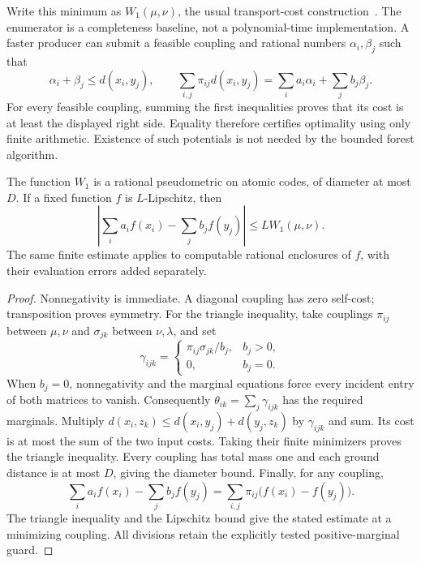 Write this minimum as \(W_1(\mu,\nu)\), the usual transport-cost construction~\cite{peyre2019}.  The enumerator is a completeness
baseline, not a polynomial-time implementation.  A faster producer can
submit a feasible coupling and rational numbers \(\alpha_i,\beta_j\)
such that
\[
 \alpha_i+\beta_j\leq d(x_i,y_j),\qquad
 \sum_{i,j}\pi_{ij}d(x_i,y_j)=\sum_i a_i\alpha_i+\sum_j b_j\beta_j.
\]
For every feasible coupling, summing the first inequalities proves that
its cost is at least the displayed right side.  Equality therefore
certifies optimality using only finite arithmetic.  Existence of such
potentials is not needed by the bounded forest algorithm.

\begin{lemma}
\label{lem:transport-metric}
The function \(W_1\) is a rational pseudometric on atomic codes, of
diameter at most \(D\).  If a fixed function \(f\) is \(L\)-Lipschitz,
then
\[
 \left|\sum_i a_if(x_i)-\sum_j b_jf(y_j)\right|
       \leq L W_1(\mu,\nu).
\]
The same finite estimate applies to computable rational enclosures of
\(f\), with their evaluation errors added separately.
\end{lemma}
\begin{proof}
Nonnegativity is immediate.  A diagonal coupling has zero self-cost;
transposition proves symmetry.  For the triangle inequality, take
couplings \(\pi_{ij}\) between \(\mu,\nu\) and \(\sigma_{jk}\)
between \(\nu,\lambda\), and set
\[
 \gamma_{ijk}=
 \begin{cases}
 \pi_{ij}\sigma_{jk}/b_j,&b_j>0,\\
 0,&b_j=0.
 \end{cases}
\]
When \(b_j=0\), nonnegativity and the marginal equations force every
incident entry of both matrices to vanish.  Consequently
\(\theta_{ik}=\sum_j\gamma_{ijk}\) has the required marginals.
Multiply \(d(x_i,z_k)\leq d(x_i,y_j)+d(y_j,z_k)\) by
\(\gamma_{ijk}\) and sum.  Its cost is at most the sum of the two
input costs.  Taking their finite minimizers proves the triangle inequality.
Every coupling has total mass one and each ground distance is at most
\(D\), giving the diameter bound.  Finally, for any coupling,
\[
 \sum_i a_if(x_i)-\sum_j b_jf(y_j)
    =\sum_{i,j}\pi_{ij}\bigl(f(x_i)-f(y_j)\bigr).
\]
The triangle inequality and the Lipschitz bound give the stated estimate
at a minimizing coupling.  All divisions retain the explicitly tested
positive-marginal guard.
\end{proof}

